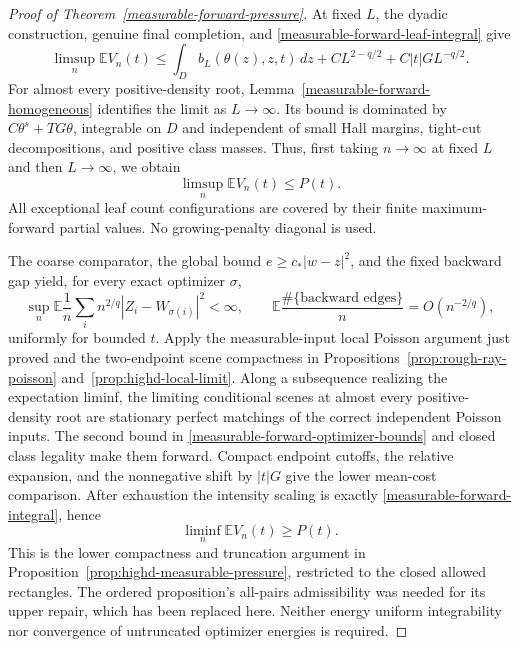 \documentclass[11pt,reqno]{amsart}
\theoremstyle{definition}
\theoremstyle{remark}
\numberwithin{equation}{section}
\newcommand{\E}{\mathbb E}
\begin{document}
\begin{proof}[Proof of Theorem~\ref{measurable-forward-pressure}]
At fixed \(L\), the dyadic construction, genuine final completion,
and \eqref{measurable-forward-leaf-integral} give
\begin{equation}
\label{measurable-forward-upper-fixed}
 \limsup_n\E V_n(t)
 \le\int_D b_L(\theta(z),z,t)\,dz
                +CL^{2-q/2}+C|t|G L^{-q/2}.
\end{equation}
For almost every positive-density root,
Lemma~\ref{measurable-forward-homogeneous} identifies the limit as
\(L\to\infty\). Its bound is dominated by
\(C\theta^s+TG\theta\), integrable on \(D\) and independent of
small Hall margins, tight-cut decompositions, and positive class masses.
Thus, first taking \(n\to\infty\) at fixed \(L\) and then
\(L\to\infty\), we obtain
\begin{equation}
\label{measurable-forward-upper}
                       \limsup_n\E V_n(t)\le P(t).
\end{equation}
All exceptional leaf count configurations are covered by their finite
maximum-forward partial values. No growing-penalty diagonal is used.

The coarse comparator, the global bound \(e\ge c_*|w-z|^2\), and
the fixed backward gap yield, for every exact optimizer \(\sigma\),
\begin{equation}
\label{measurable-forward-optimizer-bounds}
 \sup_n\E\frac1n\sum_i n^{2/q}
       |Z_i-W_{\sigma(i)}|^2<\infty,\qquad
 \E\frac{\#\{\text{backward edges}\}}n=O(n^{-2/q}),
\end{equation}
uniformly for bounded \(t\). Apply the measurable-input local Poisson
argument just proved and the two-endpoint scene compactness in
Propositions~\ref{prop:rough-ray-poisson}
and~\ref{prop:highd-local-limit}. Along a subsequence realizing the
expectation liminf, the limiting conditional scenes at almost every
positive-density root are stationary perfect matchings of the correct
independent Poisson inputs. The second bound in
\eqref{measurable-forward-optimizer-bounds} and closed class legality
make them forward. Compact endpoint cutoffs, the relative expansion,
and the nonnegative shift by \(|t|G\) give the lower mean-cost
comparison. After exhaustion the intensity scaling is exactly
\eqref{measurable-forward-integral}, hence
\begin{equation}
\label{measurable-forward-lower}
                       \liminf_n\E V_n(t)\ge P(t).
\end{equation}
This is the lower compactness and truncation argument in
Proposition~\ref{prop:highd-measurable-pressure}, restricted to the
closed allowed rectangles. The ordered proposition's all-pairs
admissibility was needed for its upper repair, which has been replaced
here. Neither energy uniform integrability nor convergence of
untruncated optimizer energies is required.


\end{proof}
\end{document}
